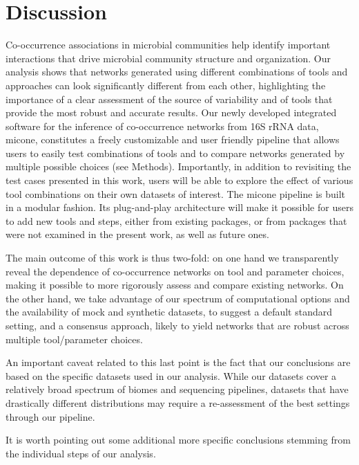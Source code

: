 
\section*{Discussion}

Co-occurrence associations in microbial communities help identify important interactions that drive microbial community structure and organization.
Our analysis shows that networks generated using different combinations of tools and approaches can look significantly different from each other, highlighting the importance of a clear assessment of the source of variability and of tools that provide the most robust and accurate results.
Our newly developed integrated software for the inference of co-occurrence networks from 16S rRNA data, \ac{micone}, constitutes a freely customizable and user friendly pipeline that allows users to easily test combinations of tools and to compare networks generated by multiple possible choices (see Methods).
Importantly, in addition to revisiting the test cases presented in this work, users will be able to explore the effect of various tool combinations on their own datasets of interest.
The \ac{micone} pipeline is built in a modular fashion.
Its plug-and-play architecture will make it possible for users to add new tools and steps, either from existing packages, or from packages that were not examined in the present work, as well as future ones.

The main outcome of this work is thus two-fold: on one hand we transparently reveal the dependence of co-occurrence networks on tool and parameter choices, making it possible to more rigorously assess and compare existing networks.
On the other hand, we take advantage of our spectrum of computational options and the availability of mock and synthetic datasets, to suggest a default standard setting, and a consensus approach, likely to yield networks that are robust across multiple tool/parameter choices.

An important caveat related to this last point is the fact that our conclusions are based on the specific datasets used in our analysis.
While our datasets cover a relatively broad spectrum of biomes and sequencing pipelines, datasets that have drastically different distributions may require a re-assessment of the best settings through our pipeline.

It is worth pointing out some additional more specific conclusions stemming from the individual steps of our analysis.

